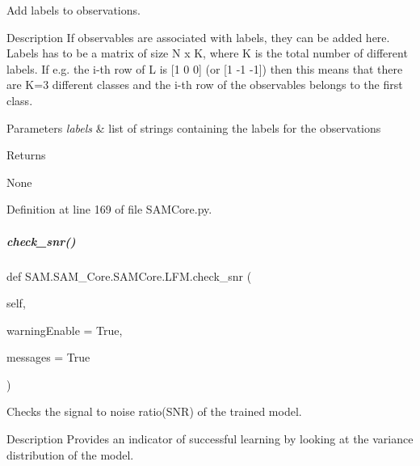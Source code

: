 Add labels to observations. 

\begin{DoxyParagraph}{Description}
If observables are associated with labels, they can be added here. Labels has to be a matrix of size N x K, where K is the total number of different labels. If e.\+g. the i-\/th row of L is \mbox{[}1 0 0\mbox{]} (or \mbox{[}1 -\/1 -\/1\mbox{]}) then this means that there are K=3 different classes and the i-\/th row of the observables belongs to the first class.
\end{DoxyParagraph}

\begin{DoxyParams}{Parameters}
{\em labels} & list of strings containing the labels for the observations\\
\hline
\end{DoxyParams}
\begin{DoxyReturn}{Returns}


None 
\end{DoxyReturn}


Definition at line 169 of file S\+A\+M\+Core.\+py.

\mbox{\label{group__icubclient__SAM__Core_a45d705cd21e288151677a313f1f35418}} 
\subparagraph{\texorpdfstring{check\+\_\+snr()}{check\_snr()}}
{\footnotesize\ttfamily def S\+A\+M.\+S\+A\+M\+\_\+\+Core.\+S\+A\+M\+Core.\+L\+F\+M.\+check\+\_\+snr (\begin{DoxyParamCaption}\item[{}]{self,  }\item[{}]{warning\+Enable = {\ttfamily True},  }\item[{}]{messages = {\ttfamily True} }\end{DoxyParamCaption})}



Checks the signal to noise ratio(\+S\+N\+R) of the trained model. 

\begin{DoxyParagraph}{Description}
Provides an indicator of successful learning by looking at the variance distribution of the model.
\end{DoxyParagraph}

